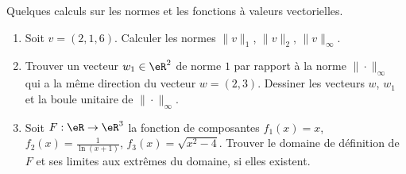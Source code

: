 \begin{exercice}\label{exoDS2011-0003}

Quelques calculs sur les normes et les fonctions à valeurs vectorielles. 

\begin{enumerate}
\item Soit $v= (2,1,6)$. Calculer les normes $\|v\|_1$, $\|v\|_2$,  $\|v\|_\infty$.
\item Trouver un vecteur $w_1\in\eR^2$ de norme $1$ par rapport à la norme $\|\cdot\|_\infty$ qui a la même direction du vecteur $w=(2,3)$. Dessiner les vecteurs $w$, $w_1$ et la boule unitaire de $\|\cdot\|_\infty$. 
\item Soit $F: \eR\to \eR^3$ la fonction de composantes $f_1(x)=x$, $\displaystyle f_2(x)=\frac{1}{\ln(x+1)}$, $f_3(x)=\sqrt{x^2-4}$. Trouver le domaine de définition de $F$ et ses limites aux extrêmes du domaine, si elles existent. 
\end{enumerate}


\end{exercice}
